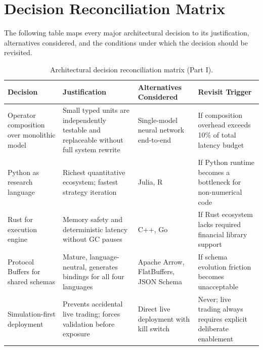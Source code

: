 \documentclass[12pt,openany]{book}
\numberwithin{equation}{chapter}
\theoremstyle{plain}
\theoremstyle{definition}
\theoremstyle{remark}
\begin{document}
\appendix
\chapter{Decision Reconciliation Matrix}

The following table maps every major architectural decision to its
justification, alternatives considered, and the conditions under which
the decision should be revisited.

\begin{table}[H]
\centering
\caption{Architectural decision reconciliation matrix (Part I).}
\label{tab:decisions_1}
\small
\begin{tabularx}{\textwidth}{p{3.5cm} p{4.5cm} p{3.5cm} p{3.0cm}}
\toprule
\textbf{Decision} & \textbf{Justification} & \textbf{Alternatives Considered} & \textbf{Revisit Trigger} \\
\midrule
Operator composition over monolithic model &
    Small typed units are independently testable and replaceable
    without full system rewrite &
    Single-model neural network end-to-end &
    If composition overhead exceeds 10\% of total latency budget \\
\midrule
Python as research language &
    Richest quantitative ecosystem; fastest strategy iteration &
    Julia, R &
    If Python runtime becomes a bottleneck for non-numerical code \\
\midrule
Rust for execution engine &
    Memory safety and deterministic latency without GC pauses &
    C++, Go &
    If Rust ecosystem lacks required financial library support \\
\midrule
Protocol Buffers for shared schemas &
    Mature, language-neutral, generates bindings for all four languages &
    Apache Arrow, FlatBuffers, JSON Schema &
    If schema evolution friction becomes unacceptable \\
\midrule
Simulation-first deployment &
    Prevents accidental live trading; forces validation before exposure &
    Direct live deployment with kill switch &
    Never; live trading always requires explicit deliberate enablement \\
\bottomrule
\end{tabularx}
\end{table}
\end{document}
